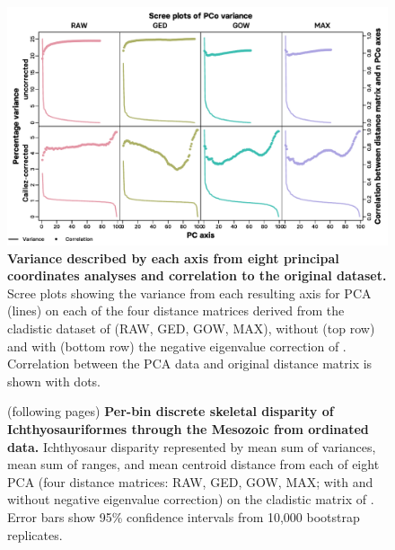 \documentclass[british,a4paper]{article}
\begin{document}

\FloatBarrier

\begin{figure}[h]
    \includegraphics[width = \textwidth, center]{supp_figures/figS4-scree_plot}
    \caption[Variance described by each axis from eight principal coordinates analyses and correlation to the original dataset]{\textbf{Variance described by each axis from eight principal coordinates analyses and correlation to the original dataset.} Scree plots showing the variance from each resulting axis for PCA (lines) on each of the four distance matrices derived from the cladistic dataset of \textcite{Moon2019a} (RAW, GED, GOW, MAX), without (top row) and with (bottom row) the negative eigenvalue correction of \textcite{Caillez1983}. Correlation between the PCA data and original distance matrix is shown with dots. \label{fig:ordination-correlation}} 
\end{figure}


\begin{figure}[h]
    \caption[Per-bin discrete skeletal disparity of Ichthyosauriformes through the Mesozoic from ordinated data]{(following pages) \textbf{Per-bin discrete skeletal disparity of Ichthyosauriformes through the Mesozoic from ordinated data.} Ichthyosaur disparity represented by mean sum of variances, mean sum of ranges, and mean centroid distance from each of eight PCA (four distance matrices: RAW, GED, GOW, MAX; with and without negative eigenvalue correction) on the cladistic matrix of \textcite{Moon2019a}. Error bars show 95\% confidence intervals from 10,000 bootstrap replicates.\label{fig:ordinated-disparity}}
\end{figure}
\FloatBarrier
\end{document}
